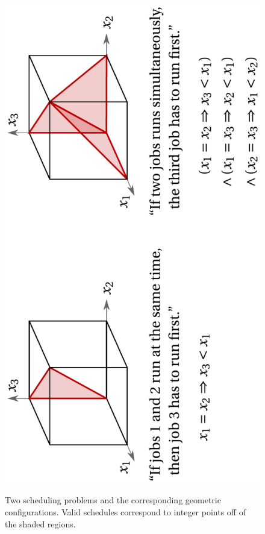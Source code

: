 \documentclass[12pt,reqno]{amsart}
\numberwithin{definition}{section}
\theoremstyle{definition}
\begin{document}






\begin{figure}[h]
\includegraphics[angle=270,width=4.5in]{schedule}
\label{fig:intro}
\caption{Two scheduling problems and the corresponding geometric configurations. 
  Valid schedules correspond to integer points off of the shaded regions. }
\end{figure}
\end{document}
